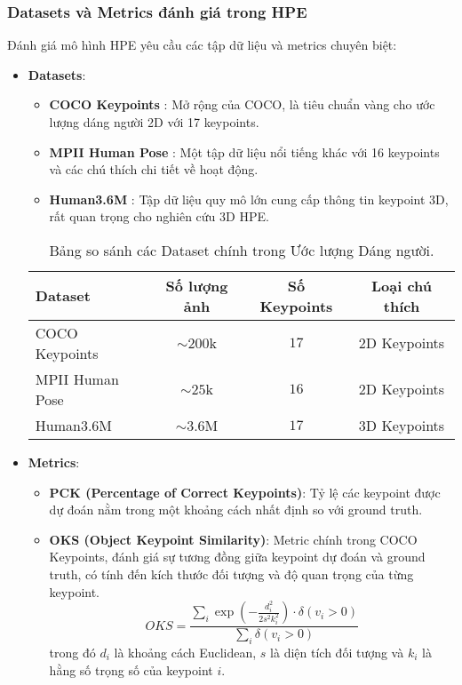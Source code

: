 \subsubsection{Datasets và Metrics đánh giá trong HPE}
Đánh giá mô hình HPE yêu cầu các tập dữ liệu và metrics chuyên biệt:
\begin{itemize}
    \item \textbf{Datasets}:
    \begin{itemize}
        \item \textbf{COCO Keypoints} \cite{lin2014microsoft}: Mở rộng của COCO, là tiêu chuẩn vàng cho ước lượng dáng người 2D với 17 keypoints.
        \item \textbf{MPII Human Pose} \cite{andriluka20142d}: Một tập dữ liệu nổi tiếng khác với 16 keypoints và các chú thích chi tiết về hoạt động.
        \item \textbf{Human3.6M} \cite{ionescu2014human36m}: Tập dữ liệu quy mô lớn cung cấp thông tin keypoint 3D, rất quan trọng cho nghiên cứu 3D HPE.
    \end{itemize}
    \begin{table}[h]
        \centering
        \caption{Bảng so sánh các Dataset chính trong Ước lượng Dáng người.}
        \label{tab:hpe_datasets}
        \begin{tabular}{lccc}
            \toprule
            \textbf{Dataset} & \textbf{Số lượng ảnh} & \textbf{Số Keypoints} & \textbf{Loại chú thích} \\
            \midrule
            COCO Keypoints & $\sim 200$k & $17$ & 2D Keypoints \\
            MPII Human Pose & $\sim 25$k & $16$ & 2D Keypoints \\
            Human3.6M & $\sim 3.6$M & $17$ & 3D Keypoints \\
            \bottomrule
        \end{tabular}
    \end{table}
    \item \textbf{Metrics}:
    \begin{itemize}
        \item \textbf{PCK (Percentage of Correct Keypoints)}: Tỷ lệ các keypoint được dự đoán nằm trong một khoảng cách nhất định so với ground truth.
        \item \textbf{OKS (Object Keypoint Similarity)}: Metric chính trong COCO Keypoints, đánh giá sự tương đồng giữa keypoint dự đoán và ground truth, có tính đến kích thước đối tượng và độ quan trọng của từng keypoint.
        \begin{equation}
        OKS = \frac{\sum_i \exp\left(-\frac{d_i^2}{2s^2k_i^2}\right) \cdot \delta(v_i > 0)}{\sum_i \delta(v_i > 0)}
        \label{eq:oks}
        \end{equation}
        trong đó $d_i$ là khoảng cách Euclidean, $s$ là diện tích đối tượng và $k_i$ là hằng số trọng số của keypoint $i$.
    \end{itemize}
\end{itemize}

